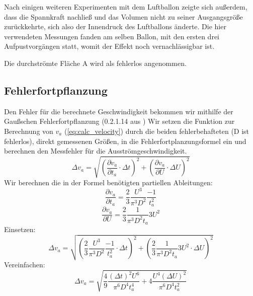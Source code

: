 \documentclass{article}
\begin{document}
            Nach einigen weiteren Experimenten mit dem Luftballon zeigte sich außerdem, dass die Spannkraft nachließ und das Volumen
            nicht zu seiner Ausgangsgröße zurückkehrte, sich also der Innendruck des Luftballons änderte.
            Die hier verwendeten Messungen fanden am selben Ballon, mit den ersten drei Aufpustvorgängen statt, womit der Effekt noch vernachlässigbar ist.

            Die durchströmte Fläche A wird als fehlerlos angenommen.

        \subsection{Fehlerfortpflanzung}
            Den Fehler für die berechnete Geschwindigkeit bekommen wir mithilfe der Gaußschen Fehlerfortpflanzung (0.2.1.14 aus \cite{AnleitungPraktikum})
            Wir setzen die Funktion zur Berechnung von \(v_a\) (\ref{eq:calc_velocity}) durch die beiden fehlerbehafteten (D ist fehlerlos),
            direkt gemessenen Größen, in die Fehlerfortplanzungsformel ein und berechnen den Messfehler für die Ausströmgeschwindigkeit. 
            \begin{equation}
                \Delta v_a = \sqrt{ {\left( \frac{ \partial v_a }{ \partial t_a } \cdot \Delta t \right)}^2 + {\left( \frac{ \partial v_a }{ \partial U } \cdot \Delta U \right)}^2 }
            \end{equation}
            Wir berechnen die in der Formel benötigten partiellen Ableitungen:
            \begin{equation}
                 \frac{\partial v_a}{ \partial t_a} = \frac{2}{3} \frac{U^3}{\pi^3 D^2} \frac{-1}{t_a^2}
            \end{equation}
            \begin{equation}
                \frac{\partial v_a}{ \partial U} = \frac{2}{3} \frac{1}{\pi^3 D^2 t_a} 3 U^2
            \end{equation}
            Einsetzen:
            \begin{equation}
                \Delta v_a = \sqrt{ {\left( \frac{2}{3} \frac{U^3}{\pi^3 D^2} \frac{-1}{t_a^2} \cdot \Delta t \right) }^2 
                + {\left( \frac{2}{3} \frac{1}{\pi^3 D^2 t_a} 3 U^2 \cdot \Delta U \right)}^2 }
            \end{equation}
            Vereinfachen:
            \begin{equation} \label{eq:fehler}
                \Delta v_a = \sqrt{ \frac{4}{9} \frac{ {(\Delta t)}^2 U^6}{\pi^6 D^4 t_a^4} + 4 \frac{U^4 {(\Delta U)}^2}{\pi^6 D^4 t_a^2}}
            \end{equation}
\end{document}
